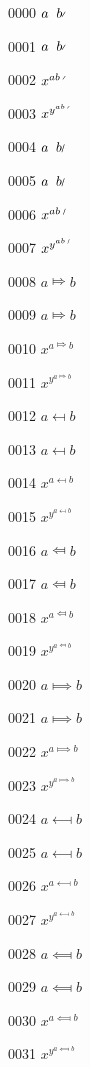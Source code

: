 \documentclass{article}
\begin{document}
0000 $a\longarrownot b$\par
0001 $\displaystyle a\longarrownot b$\par
0002 $x^{a\longarrownot b}$\par
0003 $x^{y^{a\longarrownot b}}$\par
0004 $a\Longarrownot b$\par
0005 $\displaystyle a\Longarrownot b$\par
0006 $x^{a\Longarrownot b}$\par
0007 $x^{y^{a\Longarrownot b}}$\par
0008 $a\Mapsto b$\par
0009 $\displaystyle a\Mapsto b$\par
0010 $x^{a\Mapsto b}$\par
0011 $x^{y^{a\Mapsto b}}$\par
0012 $a\mapsfrom b$\par
0013 $\displaystyle a\mapsfrom b$\par
0014 $x^{a\mapsfrom b}$\par
0015 $x^{y^{a\mapsfrom b}}$\par
0016 $a\Mapsfrom b$\par
0017 $\displaystyle a\Mapsfrom b$\par
0018 $x^{a\Mapsfrom b}$\par
0019 $x^{y^{a\Mapsfrom b}}$\par
0020 $a\Longmapsto b$\par
0021 $\displaystyle a\Longmapsto b$\par
0022 $x^{a\Longmapsto b}$\par
0023 $x^{y^{a\Longmapsto b}}$\par
0024 $a\longmapsfrom b$\par
0025 $\displaystyle a\longmapsfrom b$\par
0026 $x^{a\longmapsfrom b}$\par
0027 $x^{y^{a\longmapsfrom b}}$\par
0028 $a\Longmapsfrom b$\par
0029 $\displaystyle a\Longmapsfrom b$\par
0030 $x^{a\Longmapsfrom b}$\par
0031 $x^{y^{a\Longmapsfrom b}}$\par
\end{document}
